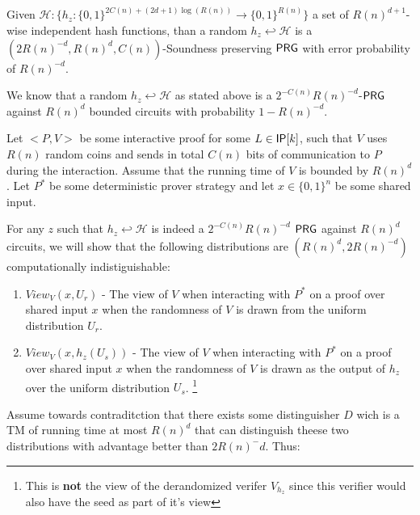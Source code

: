 \documentclass[11]{article}
\newenvironment{proof}[1][Proof]{\begin{trivlist}
\item[\hskip \labelsep {\bfseries #1}]}{\end{trivlist}}
\begin{document}
\begin{corollary}
\label{PRG from random hash}

Given $\mathcal{H}: \{h_z:\{0,1\}^{2C(n) + (2d+1)\log(R(n))} \to \{0,1\}^{R(n)}\}$ a set of $R(n)^{d+1}$-wise independent hash functions, than a random $h_z \hookleftarrow \mathcal{H}$ is a $(2R(n)^{-d}, R(n)^{d}, C(n))$-Soundness preserving $\mathsf{PRG}$ with error probability of $R(n)^{-d}$.

\end{corollary}

\begin{proof}

We know that a random $h_z \hookleftarrow \mathcal{H}$ as stated above is a $2^{-C(n)}R(n)^{-d}$-$\mathsf{PRG}$ against $R(n)^d$ bounded circuits with probability $1 - R(n)^{-d}$.

Let $<P,V>$ be some interactive proof for some $L \in \mathsf{IP}[k]$, such that $V$ uses $R(n)$ random coins and sends in total $C(n)$ bits of communication to $P$ during the interaction. Assume that the running time of $V$ is bounded by $R(n)^d$. Let $P^*$ be some deterministic prover strategy and let $x \in \{0,1\}^n$ be some shared input.

For any $z$ such that $h_z \hookleftarrow \mathcal{H}$ is indeed a $2^{-C(n)}R(n)^{-d}$ $\mathsf{PRG}$ against $R(n)^d$ circuits, we will show that the following distributions are $(R(n)^d, 2R(n)^{-d})$ computationally indistiguishable:

\begin{enumerate}
 \item $View_V(x,U_r)$ - The view of $V$ when interacting with $P^*$ on a proof over shared input $x$ when the randomness of $V$ is drawn from the uniform distribution $U_r$.
 
 \item $View_V(x, h_z(U_s))$ - The view of $V$ when interacting with $P^*$ on a proof over shared input $x$ when the randomness of $V$ is drawn as the output of $h_z$ over the uniform distribution $U_s$. \footnote{This is \textbf{not} the view of the derandomized verifer $V_{h_z}$ since this verifier would also have the seed as part of it's view}
\end{enumerate}

Assume towards contraditction that there exists some distinguisher $D$ wich is a TM of running time at most $R(n)^d$ that can distinguish theese two distributions with advantage better than $2R(n)^-d$. Thus:


\end{proof}
\end{document}
